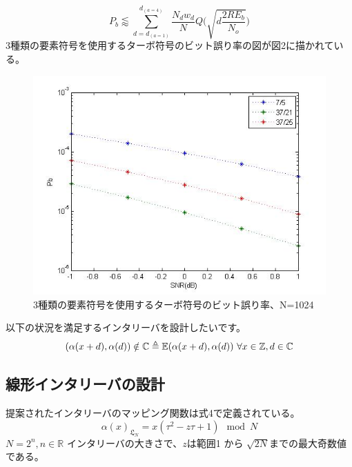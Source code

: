 \documentclass[20 pts]{article}
\begin{document}
\begin{equation}
P_b \lessapprox \sum_{d=d_{(a=1)}}^{d_{(a=4)}} \frac{N_dw_d}{N}Q\Bigg( \sqrt{d\frac{2RE_b}{N_o}}\Bigg)
\end{equation}
3種類の要素符号を使用するターボ符号のビット誤り率の図が図2に描かれている。
\begin{figure}[h!]
\includegraphics[width=\textwidth]{berValues.jpg}
\caption{3種類の要素符号を使用するターボ符号のビット誤り率、N=1024}
\label{}
\end{figure}
以下の状況を満足するインタリーバを設計したいです。
 $$(\alpha(x+d),\alpha(d)) \notin \mathbb{C} \triangleq \mathbb{E}(\alpha(x+d),\alpha(d)) \\\\\ \forall x \in \mathbb{Z} , d \in \mathbb{C}$$ 


\subsection{線形インタリーバの設計}
提案されたインタリーバのマッピング関数は式4で定義されている。
\begin{equation}
\alpha(x)_{\mathfrak{L}_N}=x(\tau^2 - z\tau + 1) \mod N
\end{equation}
$N = 2^n, n\in \mathbb{R}$ インタリーバの大きさで、$z$は範囲1 から $\sqrt{2N}$までの最大奇数値である。
\end{document}
